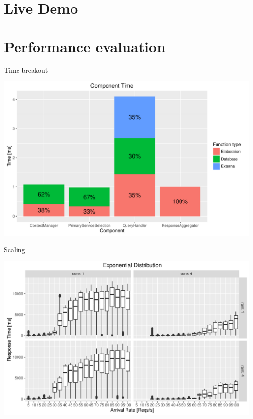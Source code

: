 \documentclass[smaller]{beamer}
\begin{document}
\section{Live Demo}
\label{sec:orgheadline25}

\section{Performance evaluation}
\label{sec:orgheadline28}
\begin{frame}[label={sec:orgheadline26}]{Time breakout}
\begin{center}
\includegraphics[width=.9\linewidth]{./images/component_time.pdf}
\end{center}
\end{frame}

\begin{frame}[label={sec:orgheadline27}]{Scaling}
\begin{center}
\includegraphics[width=.9\linewidth]{./images/exponential_analysis.pdf}
\end{center}
\end{frame}
\end{document}
